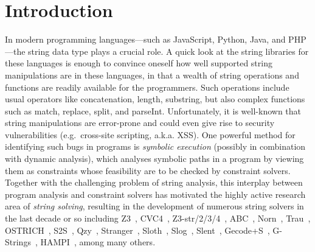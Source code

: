 
\section{Introduction}\label{sec-intro}



%
In modern programming languages---such as JavaScript, Python, Java, and PHP---the string data type plays a crucial role. 
A quick look at the string libraries for these languages is enough to convince
oneself how well supported string manipulations are in these languages, in that
a wealth of string operations and functions are readily available for the
programmers.
Such operations include usual operators like concatenation, length, substring, 
but also complex functions such as 
match, replace, split, and parseInt.
Unfortunately, it is well-known that string manipulations are error-prone and
could even give rise to
security vulnerabilities (e.g.\ cross-site scripting, a.k.a. XSS).
One powerful method for identifying such bugs in programs is \emph{symbolic 
execution} (possibly in combination with dynamic analysis), which
analyses symbolic paths in a program by viewing them as constraints %
whose feasibility are to be checked by constraint solvers. 
Together with the challenging problem of string analysis,
this interplay between program analysis and constraint solvers has motivated 
the highly active research area of \emph{string solving}, resulting in the
development of numerous string solvers in the last decade or so including
Z3~\cite{Z3}, CVC4~\cite{cvc4}, Z3-str/2/3/4~\cite{Z3-str,Z3-str2,Z3-str3,BerzishMurphy2021},
 ABC~\cite{ABC}, Norn~\cite{Abdulla14},
Trau~\cite{Z3-trau,AbdullaACDHRR18-trau,Abdulla17}, OSTRICH~\cite{CHL+19}, S2S~\cite{DBLP:conf/aplas/LeH18}, Qzy~\cite{cox2017model}, Stranger~\cite{Stranger}, Sloth~\cite{HJLRV18,AbdullaA+19},
Slog~\cite{fang-yu-circuits}, Slent~\cite{WC+18}, Gecode+S~\cite{DBLP:conf/cpaior/ScottFPS17}, G-Strings~\cite{DBLP:conf/cp/AmadiniGST17}, HAMPI~\cite{HAMPI}, among many others. %

